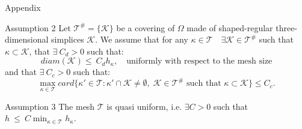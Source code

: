 \documentclass{beamer}
\begin{document}
\begin{frame}{Appendix}
	\begin{block}{Assumption 2}
		Let $\mathcal{T}^\# = \{ \mathcal{K} \}$ be a covering of $\Omega$ made
		of shaped-regular three-dimensional simplices $\mathcal{K}$. We assume
		that for any $\kappa\in\mathcal{T} \quad
		\exists\mathcal{K}\in\mathcal{T}^\#$
		such that $\kappa\subset\mathcal{K}$, that $\exists~C_d>0$ such that:
		\begin{equation*}
			diam(\mathcal{K})\leq~C_dh_\kappa, \quad \text{uniformly with
			respect to the mesh size}
		\end{equation*}
		and that $\exists~C_c>0$ such that:
		\begin{equation*}
			\max\limits_{\kappa \in \mathcal{T}} card \big\{ \kappa' \in
			\mathcal{T} : \kappa' \cap \mathcal{K} \ne \emptyset, \;
			\mathcal{K} \in \mathcal{T}^\# \text{ such that } \kappa \subset
			\mathcal{K} \big\} \leq C_c.
		\end{equation*}
	\end{block}
	\vspace*{-0.5cm}
	\begin{block}{Assumption 3}
		The mesh $\mathcal{T}$ is quasi uniform, i.e. $\exists C>0$ such that
		$h~\leq~C \min_{\kappa \in \mathcal{T}} h_\kappa$.
	\end{block}
\end{frame}
\end{document}

